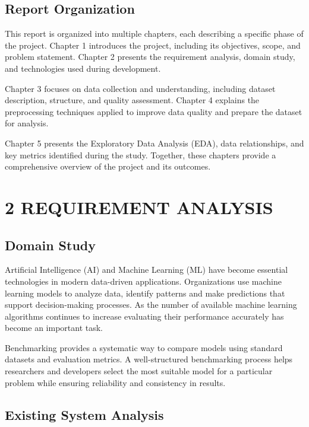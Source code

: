 \documentclass[12pt,a4paper]{report}
\begin{document}
\section{Report Organization}

This report is organized into multiple chapters, each describing a specific phase of the project. Chapter 1 introduces the project, including its objectives, scope, and problem statement. Chapter 2 presents the requirement analysis, domain study, and technologies used during development.

Chapter 3 focuses on data collection and understanding, including dataset description, structure, and quality assessment. Chapter 4 explains the preprocessing techniques applied to improve data quality and prepare the dataset for analysis.

Chapter 5 presents the Exploratory Data Analysis (EDA), data relationships, and key metrics identified during the study. Together, these chapters provide a comprehensive overview of the project and its outcomes.

\chapter*{\color{ChapterBlue}2 REQUIREMENT ANALYSIS}

\setcounter{chapter}{2}
\setcounter{section}{0}
\renewcommand{\thesection}{2.\arabic{section}}

\section{Domain Study}

Artificial Intelligence (AI) and Machine Learning (ML) have become essential technologies in modern data-driven applications. Organizations use machine learning models to analyze data, identify patterns and make predictions that support decision-making processes. As the number of available machine learning algorithms continues to increase evaluating their performance accurately has become an important task.

Benchmarking provides a systematic way to compare models using standard datasets and evaluation metrics. A well-structured benchmarking process helps researchers and developers select the most suitable model for a particular problem while ensuring reliability and consistency in results.

\section{Existing System Analysis}
\end{document}
